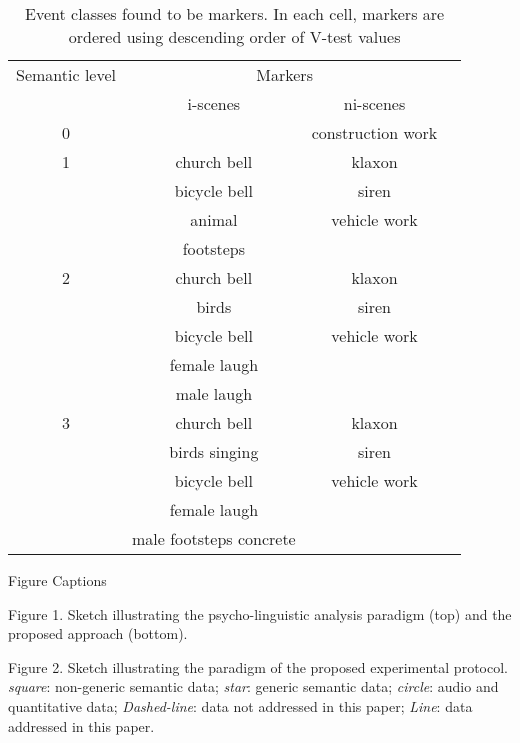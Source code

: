 \documentclass[12pt, titlepage, reqno]{article} %
\begin{document}
\newpage

\begin{table}[h]
 \caption{\label{table:markers} Event classes found to be markers. In each cell, markers are ordered using descending order of V-test values}
\begin{tabular}{c c c c} 
Semantic  level &  \multicolumn{2}{c}{Markers} \\
& i-scenes & ni-scenes \\
\hline
0  &  & construction work  \\
\hline
1  & church bell  & klaxon  \\
   & bicycle bell & siren  \\
   & animal       & vehicle work  \\
   & footsteps    &   \\
   \hline
2  & church bell  & klaxon \\
   & birds        & siren \\
   & bicycle bell & vehicle work \\
   & female laugh & \\
   & male laugh   & \\
   \hline
3  & church bell  & klaxon \\
   & birds singing & siren \\
   & bicycle bell & vehicle work \\
   & female laugh & \\
   & male footsteps concrete &  \\
  \hline
\end{tabular}
\end{table}

\newpage
 
 \begin{center}
 
 \large{Figure Captions}
 
 
 \end{center}
 
 
 \noindent
 Figure 1.  Sketch illustrating the psycho-linguistic analysis paradigm (top) and the proposed approach (bottom).
 
 \smallskip
 
 \noindent
 Figure 2.  Sketch illustrating the paradigm of the proposed experimental protocol. \textit{square}: non-generic semantic data; \textit{star}: generic semantic data; \textit{circle}: audio and quantitative data; \textit{Dashed-line}: data not addressed in this paper; \textit{Line}: data addressed in this paper.
 
\end{document}

